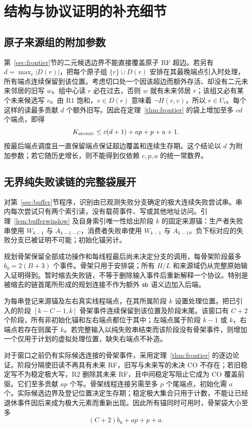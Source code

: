 \section{结构与协议证明的补充细节}\label{app:protocols}
\subsection{原子来源组的附加参数}\label{app:atomic}
第~\ref{sec:frontier}节的二元候选边界不能直接覆盖原子 RF 超边。若另有 $d=\max_r|D(r)|$，把每个原子组 $\{r\}\cup D(r)$ 安排在其最晚端点引入时处理，所有端点连续保留到该位置。考虑切口处一个因该超边而额外存活、却没有二元未来邻居的旧写 $w$。组中心读 $r$ 必在过去，否则 $w$ 就有未来邻居 $r$；该组又必有某个未来候选写 $v$。由 R1 饱和，$v\in D(r)$ 意味着 $\neg H(r,v)$，所以 $r\in U_t$。每个这样的读最多贡献 $d$ 个额外旧写。因此在定理~\ref{thm:frontier} 的袋上增加至多 $cd$ 个端点，即得
\[
 K_{\rm atomic}\le c(d+1)+ap+p+a+1.
\]
按最后端点调度且一直保留端点保证超边覆盖和连续生存期。这个结论以 $d$ 为附加参数；若它随历史增长，则不能得到仅依赖 $c,p,a$ 的统一常数界。

\subsection{无界纯失败读链的完整袋展开}\label{app:chains}
对第~\ref{sec:buffer}节程序，识别由已观测失败分支确定的极大连续失败尝试串。串内每次尝试只有两个索引读，没有载荷事件、写或其他地址访问。引理~\ref{lem:bufferwindow} 及自身索引唯一性给出阶段 $k$ 的固定来源锚：生产者失败串使用 $W_{k-1}$ 与 $A_{k-1-C}$，消费者失败串使用 $W_{k-1}$ 与 $A_{k-1}$。负下标对应的失败分支已被证明不可能；初始化锚另计。

规划骨架保留全部成功操作和每线程最后尚未决定分支的调用，每骨架阶段最多 $b_0=2(B+3)$ 个事件。骨架只用于安排袋；所有 $H/L$ 和来源域仍从完整原始输入证明得到。暂时缩去失败链，不等于删除输入事件后重新解释一个协议。特别是被缩去的链首尾所形成的规划连接不作为额外 $\mathsf{sb}$ 语义边加入后端。

为每串登记来源锚及左右真实线程端点，在其所属阶段 $k$ 设置处理位置。把已引入的阶段 $[k-C-1,k]$ 骨架事件连续保留到该位置及阶段末尾。该窗口有 $C+2$ 个阶段，所有非初始化锚和左右端点都位于其中；左端点属于阶段 $k-1$ 或 $k$，右端点若存在则属于 $k$。若完整输入以纯失败串结束而该阶段没有骨架事件，则增加一个仅用于计划的虚拟处理位置，缺失右端点不补造。

对于窗口之前仍有实际候选连接的骨架事件，采用定理~\ref{thm:frontier} 的逐边论证。阶段分隔使旧读不再具有未来 RF，旧写与未来写的未决 CO 不存在；若旧稳定写不为稳定极大写，R2 删除其未来 RF，且中间稳定写阻止它成为 CO 覆盖前驱。它们至多贡献 $ap$ 个写。骨架线程连接另需至多 $p$ 个尾端点，初始化需 $a$ 个。实际候选边界及登记位置决定生存期；稳定极大集合只用于计数，不能让已经退休事件因后来成为极大元素而重新出现。因此所有锚同时可用时，骨架袋大小至多
\[
 (C+2)b_0+ap+p+a.
\]

